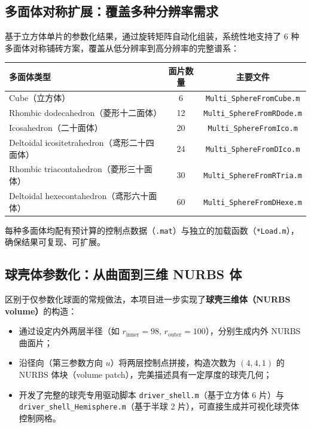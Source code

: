 \documentclass[11pt,a4paper]{article}
\begin{document}
\subsection{多面体对称扩展：覆盖多种分辨率需求}
基于立方体单片的参数化结果，通过旋转矩阵自动化组装，系统性地支持了 6 种多面体对称铺砖方案，覆盖从低分辨率到高分辨率的完整谱系：
\begin{center}
\begin{tabular}{lcc}
\hline
\textbf{多面体类型} & \textbf{面片数量} & \textbf{主要文件} \\
\hline
Cube（立方体） & 6 & \texttt{Multi\_SphereFromCube.m} \\
Rhombic dodecahedron（菱形十二面体） & 12 & \texttt{Multi\_SphereFromRDode.m} \\
Icosahedron（二十面体） & 20 & \texttt{Multi\_SphereFromIco.m} \\
Deltoidal icositetrahedron（鸢形二十四面体） & 24 & \texttt{Multi\_SphereFromDIco.m} \\
Rhombic triacontahedron（菱形三十面体） & 30 & \texttt{Multi\_SphereFromRTria.m} \\
Deltoidal hexecontahedron（鸢形六十面体） & 60 & \texttt{Multi\_SphereFromDHexe.m} \\
\hline
\end{tabular}
\end{center}
每种多面体均配有预计算的控制点数据（\texttt{.mat}）与独立的加载函数（\texttt{*Load.m}），确保结果可复现、可扩展。

\subsection{球壳体参数化：从曲面到三维 NURBS 体}
区别于仅参数化球面的常规做法，本项目进一步实现了\textbf{球壳三维体（NURBS volume）}的构造：
\begin{itemize}[leftmargin=2em]
    \item 通过设定内外两层半径（如 $r_{\text{inner}}=98$, $r_{\text{outer}}=100$），分别生成内外 NURBS 曲面片；
    \item 沿径向（第三参数方向 $u$）将两层控制点拼接，构造次数为 $(4,4,1)$ 的 NURBS 体块（volume patch），完美描述具有一定厚度的球壳几何；
    \item 开发了完整的球壳专用驱动脚本 \texttt{driver\_shell.m}（基于立方体 6 片）与 \texttt{driver\_shell\_Hemisphere.m}（基于半球 2 片），可直接生成并可视化球壳体控制网格。
\end{itemize}
\end{document}

